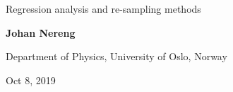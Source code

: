 \documentclass[%
oneside,                 %
final,                   %
10pt]{article}
\begin{document}

\newcommand{\exercisesection}[1]{\subsection*{#1}}






\thispagestyle{empty}

\begin{center}
{\LARGE\bf
\begin{spacing}{1.25}
Regression analysis and re-sampling methods
\end{spacing}
}
\end{center}


\begin{center}
{\bf Johan Nereng}
\end{center}

    \begin{center}
\centerline{{\small Department of Physics, University of Oslo, Norway}}
\end{center}
    

\begin{center}
Oct 8, 2019
\end{center}
\end{document}

